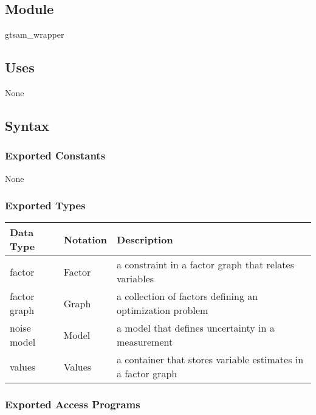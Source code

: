 \documentclass[12pt, titlepage]{article}
\begin{document}
\subsection{Module}

gtsam\_wrapper

\subsection{Uses}
None

\subsection{Syntax}

\subsubsection{Exported Constants}
None
\subsubsection{Exported Types}

\begin{center}
  \renewcommand{\arraystretch}{1.2}
  \noindent 
  \begin{tabular}{l l p{7.5cm}} 
  \toprule 
  \textbf{Data Type} & \textbf{Notation} & \textbf{Description}\\ 
  \midrule
  factor & Factor & a constraint in a factor graph that relates variables\\
  factor graph & Graph & a collection of factors defining an optimization problem\\
  noise model & Model & a model that defines uncertainty in a measurement \\
  values & Values & a container that stores variable estimates in a factor graph\\
  \bottomrule
  \end{tabular} 
  \end{center}

\subsubsection{Exported Access Programs}
\end{document}
